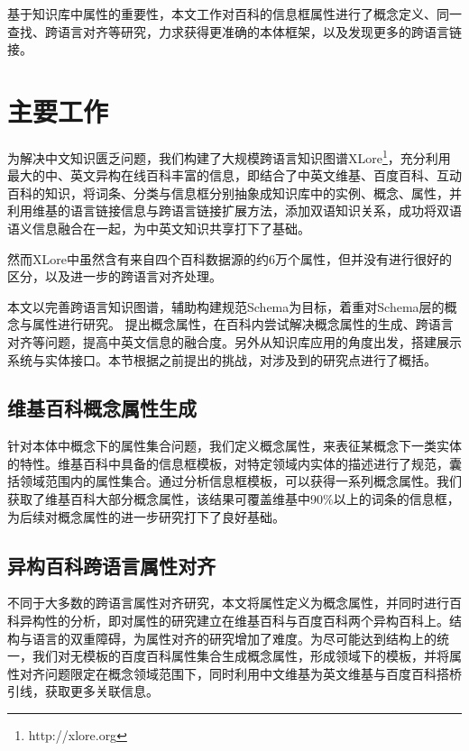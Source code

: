 基于知识库中属性的重要性，本文工作对百科的信息框属性进行了概念定义、同一查找、跨语言对齐等研究，力求获得更准确的本体框架，以及发现更多的跨语言链接。

\section{主要工作}
为解决中文知识匮乏问题，我们构建了大规模跨语言知识图谱XLore\footnote{http://xlore.org}，充分利用最大的中、英文异构在线百科丰富的信息，即结合了中英文维基、百度百科、互动百科的知识，将词条、分类与信息框分别抽象成知识库中的实例、概念、属性，并利用维基的语言链接信息与跨语言链接扩展方法\cite{wang2012cross}，添加双语知识关系，成功将双语语义信息融合在一起，为中英文知识共享打下了基础。

然而XLore中虽然含有来自四个百科数据源的约6万个属性，但并没有进行很好的区分，以及进一步的跨语言对齐处理。

本文以完善跨语言知识图谱，辅助构建规范Schema为目标，着重对Schema层的概念与属性进行研究。
提出概念属性，在百科内尝试解决概念属性的生成、跨语言对齐等问题，提高中英文信息的融合度。另外从知识库应用的角度出发，搭建展示系统与实体接口。本节根据之前提出的挑战，对涉及到的研究点进行了概括。

\subsection{维基百科概念属性生成}
针对本体中概念下的属性集合问题，我们定义概念属性，来表征某概念下一类实体的特性。维基百科中具备的信息框模板，对特定领域内实体的描述进行了规范，囊括领域范围内的属性集合。通过分析信息框模板，可以获得一系列概念属性。我们获取了维基百科大部分概念属性，该结果可覆盖维基中90\%以上的词条的信息框，为后续对概念属性的进一步研究打下了良好基础。


\subsection{异构百科跨语言属性对齐}
不同于大多数的跨语言属性对齐研究，本文将属性定义为概念属性，并同时进行百科异构性的分析，即对属性的研究建立在维基百科与百度百科两个异构百科上。结构与语言的双重障碍，为属性对齐的研究增加了难度。为尽可能达到结构上的统一，我们对无模板的百度百科属性集合生成概念属性，形成领域下的模板，并将属性对齐问题限定在概念领域范围下，同时利用中文维基为英文维基与百度百科搭桥引线，获取更多关联信息。

